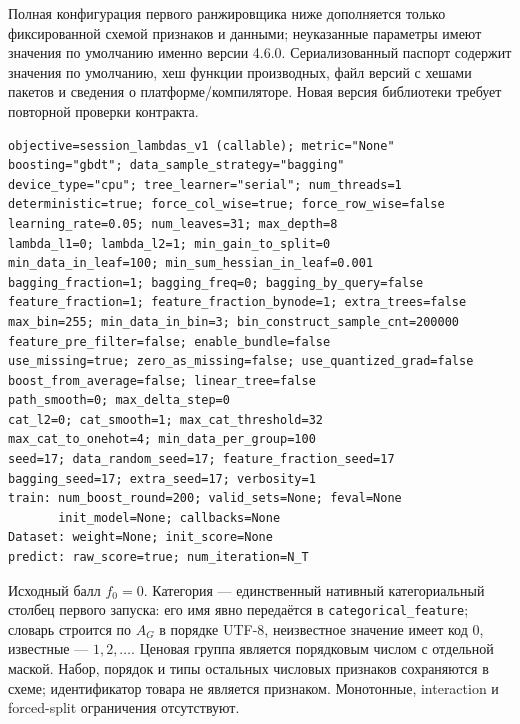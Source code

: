 \documentclass[12pt,a4paper]{article}
\newcommand{\code}[1]{{\ttfamily\small\nolinkurl{#1}}}
\theoremstyle{plainru}
\begin{document}
Полная конфигурация первого ранжировщика ниже дополняется только
фиксированной схемой признаков и данными; неуказанные параметры
имеют значения по умолчанию именно версии 4.6.0. Сериализованный паспорт
содержит значения по умолчанию, хеш функции производных, файл версий
с хешами пакетов и сведения о платформе/компиляторе. Новая версия
библиотеки требует повторной проверки контракта.
\begin{verbatim}
objective=session_lambdas_v1 (callable); metric="None"
boosting="gbdt"; data_sample_strategy="bagging"
device_type="cpu"; tree_learner="serial"; num_threads=1
deterministic=true; force_col_wise=true; force_row_wise=false
learning_rate=0.05; num_leaves=31; max_depth=8
lambda_l1=0; lambda_l2=1; min_gain_to_split=0
min_data_in_leaf=100; min_sum_hessian_in_leaf=0.001
bagging_fraction=1; bagging_freq=0; bagging_by_query=false
feature_fraction=1; feature_fraction_bynode=1; extra_trees=false
max_bin=255; min_data_in_bin=3; bin_construct_sample_cnt=200000
feature_pre_filter=false; enable_bundle=false
use_missing=true; zero_as_missing=false; use_quantized_grad=false
boost_from_average=false; linear_tree=false
path_smooth=0; max_delta_step=0
cat_l2=0; cat_smooth=1; max_cat_threshold=32
max_cat_to_onehot=4; min_data_per_group=100
seed=17; data_random_seed=17; feature_fraction_seed=17
bagging_seed=17; extra_seed=17; verbosity=1
train: num_boost_round=200; valid_sets=None; feval=None
       init_model=None; callbacks=None
Dataset: weight=None; init_score=None
predict: raw_score=true; num_iteration=N_T
\end{verbatim}
Исходный балл $f_0=0$. Категория --- единственный нативный
категориальный столбец первого запуска: его имя явно передаётся
в \code{categorical\_feature}; словарь строится по $A_G$ в порядке
UTF-8, неизвестное значение имеет код $0$, известные --- $1,2,\ldots$.
Ценовая группа является порядковым числом с отдельной маской.
Набор, порядок и типы остальных числовых признаков сохраняются
в схеме; идентификатор товара не является признаком.
Монотонные, interaction и forced-split ограничения отсутствуют.
\end{document}
